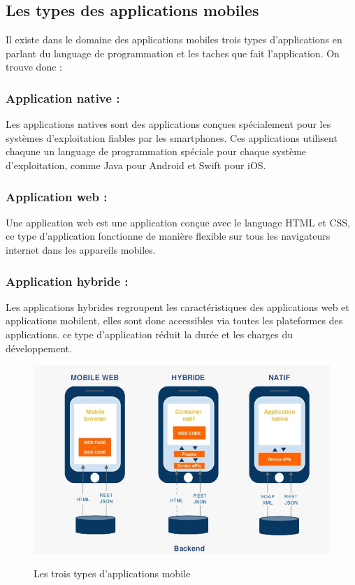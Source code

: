 \subsection{Les types des applications mobiles}
Il existe dans le domaine des applications mobiles trois types d'applications en parlant du language de programmation et les taches que fait l'application. On trouve donc :
\subsubsection{Application native :}
Les applications natives sont des applications conçues spécialement pour les systèmes d'exploitation fiables par les smartphones. Ces applications utilisent chaqune un language de programmation spéciale pour chaque système d'exploitation, comme Java pour Android et Swift pour iOS.
\subsubsection{Application web :}
Une application web est une application conçue avec le language HTML et CSS, ce type d'application fonctionne de manière flexible sur tous les navigateurs internet dans les appareils mobiles. 
\subsubsection{Application hybride :}
Les applications hybrides regroupent les caractéristiques des applications web et applications mobilent, elles sont donc accessibles via toutes les plateformes des applications. ce type d'application réduit la durée et les charges du développement.


\begin{figure}[!ht]
    \centering
    \includegraphics[width=6in]{images/Chapitre1/type_applications_mobile.jpg}
    \label{fig:type_applications}
    \caption{Les trois types d'applications mobile}
\end{figure}
